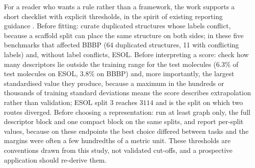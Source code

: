 For a reader who wants a rule rather than a framework, the work supports a short checklist with explicit thresholds, in the spirit of existing reporting guidance \cite{bender2022guidelines,artrith2021best,heil2021reproducibility}. Before fitting: curate duplicated structures whose labels conflict, because a scaffold split can place the same structure on both sides; in these five benchmarks that affected BBBP (64 duplicated structures, 11 with conflicting labels) and, without label conflicts, ESOL. Before interpreting a score: check how many descriptors lie outside the training range for the test molecules ($6.3\%$ of test molecules on ESOL, $3.8\%$ on BBBP) and, more importantly, the largest standardised value they produce, because a maximum in the hundreds or thousands of training standard deviations means the score describes extrapolation rather than validation; ESOL split 3 reaches $3114$ and is the split on which two routes diverged. Before choosing a representation: run at least graph only, the full descriptor block and one compact block on the same splits, and report per-split values, because on these endpoints the best choice differed between tasks and the margins were often a few hundredths of a metric unit. These thresholds are conventions drawn from this study, not validated cut-offs, and a prospective application should re-derive them.

